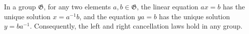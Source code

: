 In a group $\mathfrak{G}$, for any two elements $a, b \in \mathfrak{G}$, the linear equation $ax = b$ has the unique solution $x = a^{-1}b$, and the equation $ya = b$ has the unique solution $y = ba^{-1}$. Consequently, the left and right cancellation laws hold in any group.
